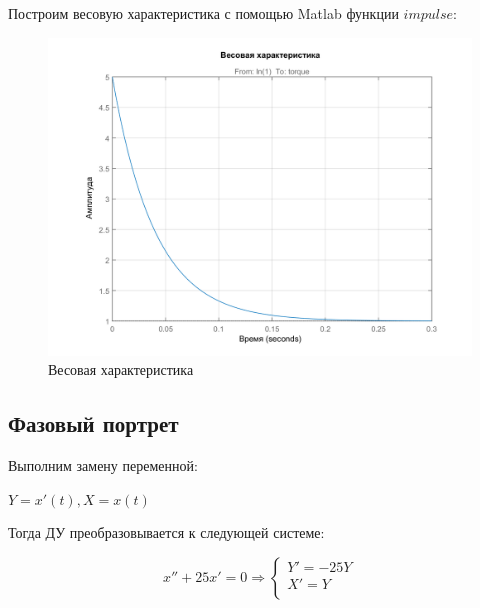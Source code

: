 \documentclass[14pt,a4paper,report]{report}
\begin{document}
Построим весовую характеристика с помощью Matlab функции $impulse$:

\begin{figure}[h!]
	\centering
	\includegraphics[scale = 0.60]{images/impulse.png}
	\caption{Весовая характеристика}
	\label{image:6}
\end{figure}

\subsection{Фазовый портрет}

Выполним замену переменной:

$Y=x'(t), X=x(t)$


Тогда ДУ преобразовывается к следующей системе:

\begin{equation*}
	\text{$x''+25x'=0$}
	\Longrightarrow
	\begin{cases}
		\text{$Y'=-25Y$} \\
		\text{$X'=Y$} \\
	\end{cases}
\end{equation*}
\end{document}
